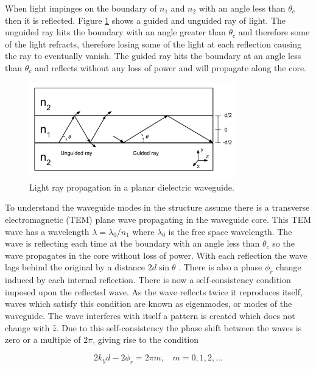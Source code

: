When light impinges on the boundary of $n_1$ and $n_2$ with an angle less than
$\theta_c$ then it is reflected. Figure \ref{fig:planar_reflection} shows a
guided and unguided ray of light. The unguided ray hits the boundary with an
angle greater than $\theta_c$ and therefore some of the light refracts,
therefore losing some of the light at each reflection causing the ray to
eventually vanish. The guided ray hits the boundary at an angle less than
$\theta_c$ and reflects without any loss of power and will propagate along the
core.

\begin{figure}[h!] \begin{center}
\includegraphics[width=0.8\textwidth]{images/thesis_planar_reflection.pdf}
\end{center} \caption{Light ray propagation in a planar dielectric waveguide.}
\label{fig:planar_reflection} \end{figure}

To understand the waveguide modes in the structure assume there is a transverse
electromagnetic (TEM) plane wave propagating in the waveguide core. This TEM
wave has a wavelength $\lambda = \lambda_0/n_1$ where $\lambda_0$ is the free
space wavelength. The wave is reflecting each time at the boundary with an angle
less than $\theta_c$ so the wave propagates in the core without loss of power.
With each reflection the wave lags behind the original by a distance
$2d\sin{\theta}$ \cite{saleh1991fundamentals}. There is also a phase $\phi_r$
change induced by each internal reflection. There is now a self-consistency
condition imposed upon the reflected wave. As the wave reflects twice it
reproduces itself, waves which satisfy this condition are known as eigenmodes,
or modes of the waveguide. The wave interferes with itself a pattern is created
which does not change with $\hat{z}$. Due to this self-consistency the phase
shift between the waves is zero or a multiple of $2\pi$, giving rise to the
condition

\begin{equation}\label{eqn:mode_eqn} 2 k_y d - 2 \phi_r = 2\pi m, \ \ \ \ m =
\mathrm{0, 1, 2,...} \end{equation}

